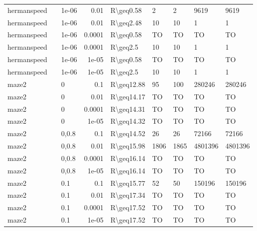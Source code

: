\begin{longtable}{lllrlllll}
 hermanspeed   &           & 1e-06 & 0.01   & R\textbackslash{}geq0.58  & 2    & 2    & 9619     & 9619    \\
 hermanspeed   &           & 1e-06 & 0.01   & R\textbackslash{}geq2.48  & 10   & 10   & 1        & 1       \\
 hermanspeed   &           & 1e-06 & 0.0001 & R\textbackslash{}geq0.58  & TO   & TO   & TO       & TO      \\
 hermanspeed   &           & 1e-06 & 0.0001 & R\textbackslash{}geq2.5   & 10   & 10   & 1        & 1       \\
 hermanspeed   &           & 1e-06 & 1e-05  & R\textbackslash{}geq0.58  & TO   & TO   & TO       & TO      \\
 hermanspeed   &           & 1e-06 & 1e-05  & R\textbackslash{}geq2.5   & 10   & 10   & 1        & 1       \\
 maze2         &           & 0     & 0.1    & R\textbackslash{}geq12.88 & 95   & 100  & 280246   & 280246  \\
 maze2         &           & 0     & 0.01   & R\textbackslash{}geq14.17 & TO   & TO   & TO       & TO      \\
 maze2         &           & 0     & 0.0001 & R\textbackslash{}geq14.31 & TO   & TO   & TO       & TO      \\
 maze2         &           & 0     & 1e-05  & R\textbackslash{}geq14.32 & TO   & TO   & TO       & TO      \\
 maze2         &           & 0,0.8 & 0.1    & R\textbackslash{}geq14.52 & 26   & 26   & 72166    & 72166   \\
 maze2         &           & 0,0.8 & 0.01   & R\textbackslash{}geq15.98 & 1806 & 1865 & 4801396  & 4801396 \\
 maze2         &           & 0,0.8 & 0.0001 & R\textbackslash{}geq16.14 & TO   & TO   & TO       & TO      \\
 maze2         &           & 0,0.8 & 1e-05  & R\textbackslash{}geq16.14 & TO   & TO   & TO       & TO      \\
 maze2         &           & 0.1   & 0.1    & R\textbackslash{}geq15.77 & 52   & 50   & 150196   & 150196  \\
 maze2         &           & 0.1   & 0.01   & R\textbackslash{}geq17.34 & TO   & TO   & TO       & TO      \\
 maze2         &           & 0.1   & 0.0001 & R\textbackslash{}geq17.52 & TO   & TO   & TO       & TO      \\
 maze2         &           & 0.1   & 1e-05  & R\textbackslash{}geq17.52 & TO   & TO   & TO       & TO      \\

\end{longtable}
